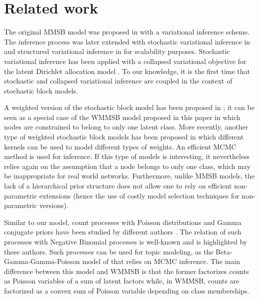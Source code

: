 \section{Related work}
\label{sec:rl}


The original MMSB model was proposed in \cite{airoldi2009mixed} with a variational inference scheme. The inference process was later extended with stochastic variational inference in \cite{gopalan2013efficient} and structured variational inference in \cite{kim2013efficient} for scalability purposes. Stochastic variational inference has been applied with a collapsed variational objective for the latent Dirichlet allocation model \cite{foulds2013stochastic}. To our knowledge, it is the first time that stochastic and collapsed variational inference are coupled in the context of stochastic block models.

A weighted version of the stochastic block model has been proposed in \cite{aicher2014learning}; it can be seen as a special case of the WMMSB model proposed in this paper in which nodes are constrained to belong to only one latent class. More recently, another type of weighted stochastic block models has been proposed \cite{peixoto2018nonparametric} in which different kernels can be used to model different types of weights. An efficient MCMC method is used for inference. If this type of models is interesting, it nevertheless relies again on the assumption that a node belongs to only one class, which may be inappropriate for real world networks. Furthermore, unlike MMSB models, the lack of a hierarchical prior structure does not allow one to rely on efficient non-parametric extensions (hence the use of costly model selection techniques for non-parametric versions).

Similar to our model, count processes with Poisson distributions and Gamma conjugate priors have been studied by different authors \cite{zhou2012augment, zhou2015negative}. The relation of such processes with Negative Binomial processes is well-known and is highlighted by these authors. Such processes can be used for topic modeling, as the Beta-Gamma-Gamma-Poisson model of \cite{zhou2012beta} that relies on MCMC inference. The main difference between this model and WMMSB is that the former factorizes counts as Poisson variables of a sum of latent factors while, in WMMSB, counts are factorized as a convex sum of Poisson variable depending on class memberships.

